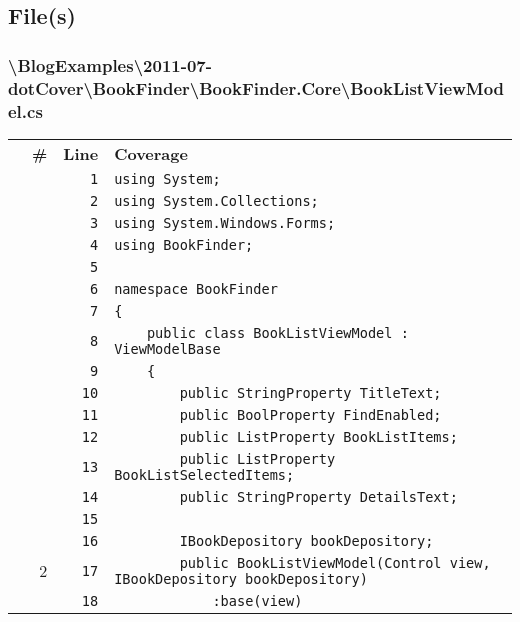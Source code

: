 \documentclass[a4paper,10pt]{article}
\begin{document}
\subsection{File(s)}
\subsubsection{\textbackslash BlogExamples\textbackslash 2011-07-dotCover\textbackslash BookFinder\textbackslash BookFinder.Core\textbackslash BookListViewModel.cs}
\begin{longtable}[l]{lrrl}
\textbf{} & \textbf{\#} & \textbf{Line} & \textbf{Coverage}\\
\cellcolor{gray} &  & \verb~1~ & \verb~using System;~\\
\cellcolor{gray} &  & \verb~2~ & \verb~using System.Collections;~\\
\cellcolor{gray} &  & \verb~3~ & \verb~using System.Windows.Forms;~\\
\cellcolor{gray} &  & \verb~4~ & \verb~using BookFinder;~\\
\cellcolor{gray} &  & \verb~5~ & \verb~~\\
\cellcolor{gray} &  & \verb~6~ & \verb~namespace BookFinder~\\
\cellcolor{gray} &  & \verb~7~ & \verb~{~\\
\cellcolor{gray} &  & \verb~8~ & \verb~    public class BookListViewModel : ViewModelBase~\\
\cellcolor{gray} &  & \verb~9~ & \verb~    {~\\
\cellcolor{gray} &  & \verb~10~ & \verb~        public StringProperty TitleText;~\\
\cellcolor{gray} &  & \verb~11~ & \verb~        public BoolProperty FindEnabled;~\\
\cellcolor{gray} &  & \verb~12~ & \verb~        public ListProperty BookListItems;~\\
\cellcolor{gray} &  & \verb~13~ & \verb~        public ListProperty BookListSelectedItems;~\\
\cellcolor{gray} &  & \verb~14~ & \verb~        public StringProperty DetailsText;~\\
\cellcolor{gray} &  & \verb~15~ & \verb~~\\
\cellcolor{gray} &  & \verb~16~ & \verb~        IBookDepository bookDepository;~\\
\cellcolor{green} & 2 & \verb~17~ & \verb~        public BookListViewModel(Control view, IBookDepository bookDepository)~\\
\cellcolor{gray} &  & \verb~18~ & \verb~            :base(view)~\\

\end{longtable}
\end{document}
